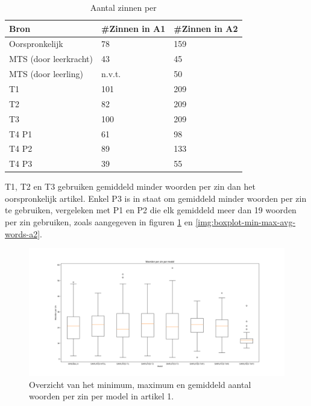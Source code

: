 \begin{table}[h]
	\centering
	\begin{tabular}{ | m{3cm} | m{3cm} | m{3cm} | } 
		\hline
		Bron & #Zinnen in A1 & #Zinnen in A2 \\
		\hline
		Oorspronkelijk & 78  & 159 \\ 
		\hline
		MTS (door leerkracht) & 43 & 45 \\
		\hline
		MTS (door leerling) & n.v.t. & 50 \\
		\hline
		T1 & 101 & 209 \\
		\hline
		T2 & 82 & 209 \\
		\hline
		T3 & 100 & 209 \\
		\hline
		T4 P1 & 61 & 98 \\
		\hline
		T4 P2 & 89 & 133 \\
		\hline
		T4 P3 & 39 & 55 \\
		\hline
	\end{tabular}
	\label{table:resultaten-aantal-woorden}
	\caption{Aantal zinnen per }
\end{table}

T1, T2 en T3 gebruiken gemiddeld minder woorden per zin dan het oorspronkelijk artikel. Enkel P3 is in staat om gemiddeld minder woorden per zin te gebruiken, vergeleken met P1 en P2 die elk gemiddeld meer dan 19 woorden per zin gebruiken, zoals aangegeven in figuren \ref{img:boxplot-min-max-avg-words-a1} en \ref{img:boxplot-min-max-avg-words-a2}.

\begin{figure}
	\includegraphics[width=\linewidth]{img/boxplot-avg-a1.png}
	\caption{Overzicht van het minimum, maximum en gemiddeld aantal woorden per zin per model in artikel 1.}
	\label{img:boxplot-min-max-avg-words-a1}
\end{figure}

